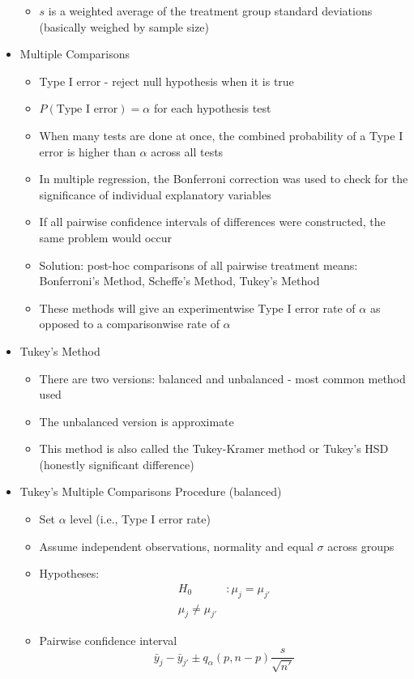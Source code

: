 \documentclass[12pt]{article}
\begin{document}
\begin{itemize}
\begin{itemize}
\item $s$ is a weighted average of the treatment group standard deviations (basically weighed by sample size) \end{itemize} 
\item Multiple Comparisons \begin{itemize} 
\item Type I error - reject null hypothesis when it is true 
\item $P(\text{Type I error}) = \alpha$ for each hypothesis test 
\item When many tests are done at once, the combined probability of a Type I error is higher than $\alpha$ across all tests 
\item In multiple regression, the Bonferroni correction was used to check for the significance of individual explanatory variables 
\item If all pairwise confidence intervals of differences were constructed, the same problem would occur 
\item Solution: post-hoc comparisons of all pairwise treatment means: Bonferroni's Method, Scheffe's Method, Tukey's Method 
\item These methods will give an experimentwise Type I error rate of $\alpha$ as opposed to a comparisonwise rate of $\alpha$ \end{itemize} 
\item Tukey's Method \begin{itemize} 
\item There are two versions: balanced and unbalanced - most common method used 
\item The unbalanced version is approximate
\item This method is also called the Tukey-Kramer method or Tukey's HSD (honestly significant difference) \end{itemize} 
\item Tukey's Multiple Comparisons Procedure (balanced) \begin{itemize} 
\item Set $\alpha$ level (i.e., Type I error rate) 
\item Assume independent observations, normality and equal $\sigma$ across groups 
\item Hypotheses: $$ \begin{aligned} H_0 &: \mu_j = \mu_{j'} \\ \mu_j \neq \mu_{j'} \end{aligned} $$ 
\item Pairwise confidence interval $$ \bar{y}_j - \bar{y}_{j'} \pm q_\alpha(p, n-p) \frac{s}{\sqrt{n'}} $$ \begin{itemize}

\end{itemize}
\end{itemize}
\end{itemize}
\end{document}
